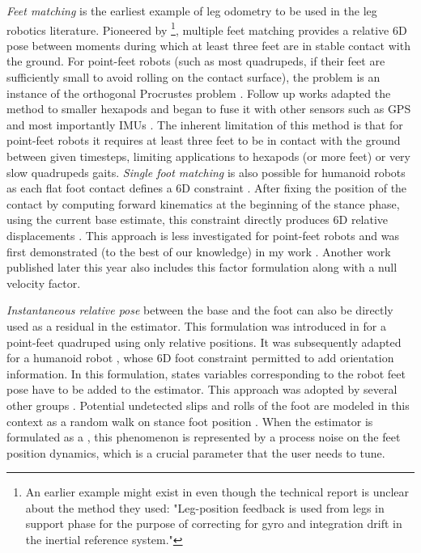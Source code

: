 \textit{Feet matching} is the earliest example of leg odometry to be used in the leg robotics literature. Pioneered by \cite{roston1991dead} 
\footnote{An earlier example might exist in \cite{waldron1986adaptive} even though the technical report is unclear about the method they used: 
"Leg-position feedback is used from legs in support phase for the purpose of correcting for gyro and integration drift in the inertial reference system."},
multiple feet matching provides a relative 6D pose between moments during which at least three feet are in stable contact with the ground.
For point-feet robots (such as most quadrupeds, if their feet are sufficiently small to avoid rolling on the contact surface), the problem is an instance of the orthogonal Procrustes problem \cite{eggert1997estimating}.
Follow up works adapted the method to smaller hexapods \cite{lin2005leg} and began to fuse it with other sensors such as GPS \cite{gassmann2005localization, cobano2008location} 
and most importantly IMUs \cite{lin2006sensor, reinstein2011dead}.
The inherent limitation of this method is that for point-feet robots it requires at least three feet to be in contact with the ground between given timesteps, limiting
applications to hexapods (or more feet) or very slow quadrupeds gaits.
\textit{Single foot matching} is also possible for humanoid robots as each flat foot contact defines a 6D constraint \cite{bloesch2018technical}. 
After fixing the position of the contact by computing forward kinematics at the beginning of the stance phase, using the current base estimate, this constraint directly produces 6D 
relative displacements \cite{flayols2017experimental,xinjilefu2014decoupled,johnson2015team}. This approach is less investigated for point-feet robots and was first 
demonstrated (to the best of our knowledge) in my work \cite{fourmy2021contact}. Another work published later this year \cite{kim2021legged} also includes this 
factor formulation along with a null velocity factor. 

\textit{Instantaneous relative pose} between the base and the foot can also be directly used as a residual in the estimator. This formulation
was introduced in \cite{bloesch2013state, bloesch2013stateSlippery} for a point-feet quadruped using only relative positions. It was subsequently 
adapted for a humanoid robot \cite{rotella2014state}, whose 6D foot constraint permitted to add orientation information. In this formulation, 
states variables corresponding to the robot feet pose have to 
be added to the estimator. This approach was adopted by several other groups \cite{hartley2018legged, hartley2018hybrid, hartley2020contact, bledt2018cheetah}.
Potential undetected slips and rolls of the foot are modeled in this context as a random walk on stance foot position \cite{bloesch2013state,rotella2014state}. When the estimator is formulated as a 
\KalmanF \cite{kalman1960new}, this phenomenon is represented by a process noise on the feet position dynamics, which is a crucial parameter that the user needs to tune.


